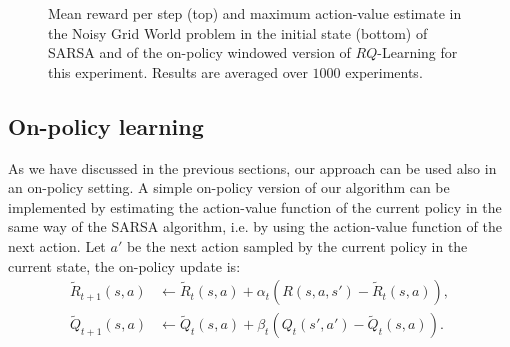 \begin{figure}[t]
\begin{minipage}{\columnwidth}
\end{minipage}
  \caption[Grid world with holes algorithms comparison - 2]{Mean reward per step (top) and maximum action-value estimate in the Noisy Grid World problem in the initial state (bottom) of SARSA and of the on-policy windowed version of $RQ$-Learning for this experiment. Results are averaged over $1000$ experiments.}
  \label{F:sarsa}
\end{figure}

\subsection{On-policy learning}
As we have discussed in the previous sections, our approach can be used also in an on-policy setting. A simple on-policy version of our algorithm can be implemented by estimating the action-value function of the current policy in the same way of the SARSA algorithm, i.e. by using the action-value function of the next action. Let $a'$ be the next action sampled by the current policy in the current state, the on-policy update is:
\begin{align*}
\tilde{R}_{t+1}(s,a) & \leftarrow\tilde{R}_t(s,a)+\alpha_t(R(s,a,s')-\tilde{R}_t(s,a)),\\
\tilde{Q}_{t+1}(s,a) & \leftarrow\tilde{Q}_t(s,a)+\beta_t(Q_t(s',a')-\tilde{Q}_t(s,a)).
\end{align*}

